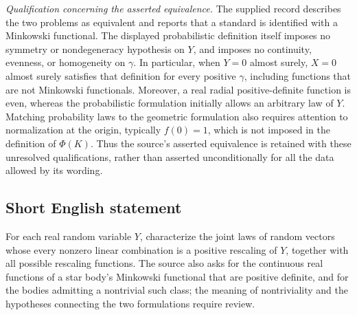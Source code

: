 \documentclass[11pt]{article}
\begin{document}
\emph{Qualification concerning the asserted equivalence.} The supplied record describes the two problems as equivalent and reports that a standard is identified with a Minkowski functional. The displayed probabilistic definition itself imposes no symmetry or nondegeneracy hypothesis on \(Y\), and imposes no continuity, evenness, or homogeneity on \(\gamma\). In particular, when \(Y=0\) almost surely, \(X=0\) almost surely satisfies that definition for every positive \(\gamma\), including functions that are not Minkowski functionals. Moreover, a real radial positive-definite function is even, whereas the probabilistic formulation initially allows an arbitrary law of \(Y\). Matching probability laws to the geometric formulation also requires attention to normalization at the origin, typically \(f(0)=1\), which is not imposed in the definition of \(\Phi(K)\). Thus the source's asserted equivalence is retained with these unresolved qualifications, rather than asserted unconditionally for all the data allowed by its wording.
\subsection{Short English statement}
For each real random variable \(Y\), characterize the joint laws of random vectors whose every nonzero linear combination is a positive rescaling of \(Y\), together with all possible rescaling functions. The source also asks for the continuous real functions of a star body's Minkowski functional that are positive definite, and for the bodies admitting a nontrivial such class; the meaning of nontriviality and the hypotheses connecting the two formulations require review.
\end{document}
